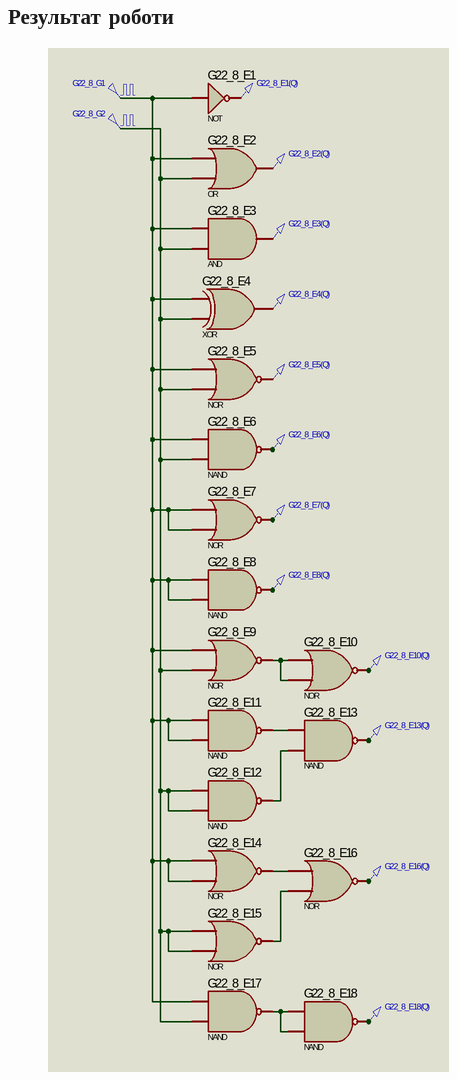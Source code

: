 \documentclass{article}
\begin{document}
\begin{normalsize}
	\section*{Результат роботи}
	\begin{figure}[H]
		\centering
		\includegraphics[scale=0.35]{s1}	

\end{figure}
\end{normalsize}
\end{document}
